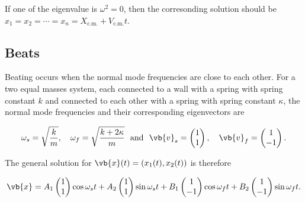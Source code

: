 \documentclass[a4paper,12pt]{report}
\begin{document}
If one of the eigenvalue is \(\omega^2 = 0\), then the corresonding solution should be \(x_1 = x_2 = \cdots  = x_{n} = X_{\text{c.m.} } + V_{\text{c.m.} }t   \).   

\subsection{Beats}

Beating occurs when the normal mode frequencies are close to each other. For a two equal masses system, each connected to a wall with a spring with spring constant \(k\) and connected to each other with a spring with spring constant \(\kappa \), the normal mode frequencies and their corresponding eigenvectors are

\begin{equation}
	\omega _{s} = \sqrt{\frac{k}{m} }, \quad  \omega _{f} = \sqrt{\frac{k+2\kappa }{m} } ~\text { and }~ \vb{v} _{s} = \begin{pmatrix}
		 1 \\
		 1 \\
	\end{pmatrix}, \quad \vb{v} _{f} = \begin{pmatrix}
		 1 \\
		 -1 \\
	\end{pmatrix}.
\end{equation}

The general solution for \(\vb{x} (t) = (x_1(t) ,x_2 (t))\) is therefore

\begin{equation}
	\vb{x} = A_1 \begin{pmatrix}
		 1 \\
		 1 \\
	\end{pmatrix} \cos \omega _{s}t  + A_2 \begin{pmatrix}
		 1 \\
		 1 \\
	\end{pmatrix} \sin \omega _{s}t  + B_1 \begin{pmatrix}
		 1 \\
		 -1 \\
	\end{pmatrix} \cos \omega _{f}t  + B_2 \begin{pmatrix}
		 1 \\
		 -1 \\
	\end{pmatrix} \sin \omega _{f}t .
\end{equation}
\end{document}
